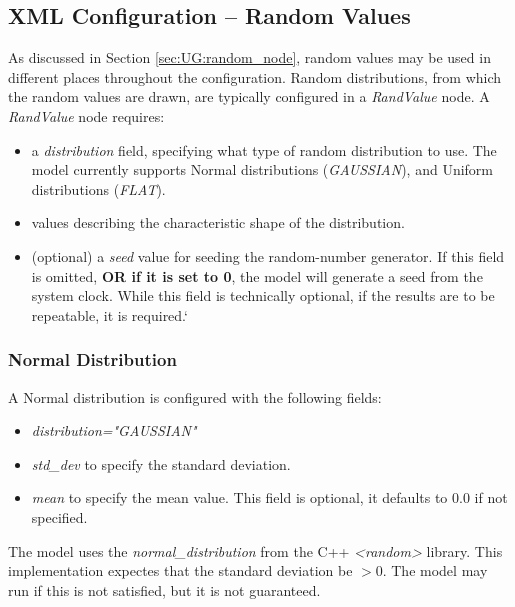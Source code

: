 \documentclass[11pt,fleqn]{report}
\begin{document}
\subsection {XML Configuration -- Random Values}
As discussed in Section \ref{sec:UG:random_node}, random values may be used
in different places throughout the configuration. Random distributions, from
which the random values are drawn, are typically configured in a
\textit{RandValue} node. A \textit{RandValue} node requires:
\begin{itemize}
\item a \textit{distribution} field, specifying what type of random
      distribution to use. The model currently supports Normal distributions
      (\textit{GAUSSIAN}), and Uniform distributions (\textit{FLAT}).
\item values describing the characteristic shape of the distribution.
\item (optional) a \textit{seed} value for seeding the random-number
      generator. If this field is omitted, \textbf{OR if it is set to 0}, the
      model will generate a seed from the system clock. While this field is
      technically optional, if the results are to be repeatable, it is
      required.`
\end{itemize}

\subsubsection {Normal Distribution}
A Normal distribution is configured with the following fields:
\begin{itemize}
\item \textit{distribution="GAUSSIAN"}
\item \textit{std\_dev} to specify the standard deviation.
\item \textit{mean} to specify the mean value. This field is optional, it
      defaults to 0.0 if not specified.
\end{itemize}
The model uses the \textit{normal\_distribution} from the C++
\textit{<random>} library. This implementation expectes that the standard
deviation be $>0$. The model may run if this is not
satisfied, but it is not guaranteed.
\end{document}
